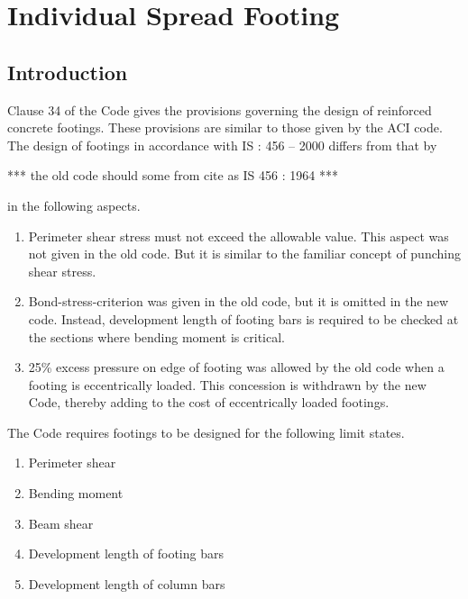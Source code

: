 \chapter{Individual Spread Footing}

\section{Introduction} Clause 34 of the Code gives the provisions
governing the design of reinforced concrete footings.  These provisions are
similar to those given by the ACI code. The design of footings in
accordance with IS : 456 -- 2000 differs from that by

 ***  the old code  should some from cite as IS 456 : 1964 ***

in the
following aspects.
\begin{enumerate}

\item Perimeter shear stress must not exceed the allowable value. This
aspect was not given in the old code. But it is similar to the familiar
concept of punching shear stress.

\item Bond-stress-criterion was given in the old code, but it is omitted in
the new code. Instead, development length of footing bars is required to be
checked at the sections where bending moment is critical.

\item 25\% excess pressure on edge of footing was allowed by the old code
when a footing is eccentrically loaded. This concession is withdrawn by
the new Code, thereby adding to the cost of eccentrically loaded footings.
\end{enumerate}
The Code requires footings to be designed for the following limit states.

\begin{enumerate}
\item Perimeter shear
\item Bending moment
\item Beam shear
\item Development length of footing bars
\item Development length of column bars
\end{enumerate}

